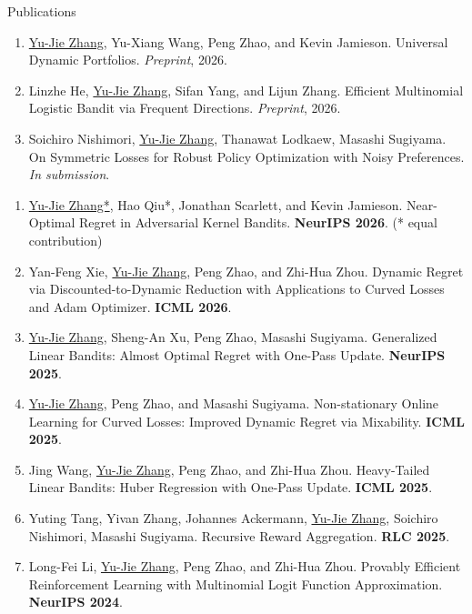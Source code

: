\documentclass{resume} %
\begin{document}
\begin{rSection}{Publications}
\begin{enumerate}[leftmargin=0.2in]
	\item \underline{Yu-Jie Zhang}, Yu-Xiang Wang, Peng Zhao, and Kevin Jamieson. Universal Dynamic Portfolios. \emph{Preprint}, 2026.
	\item Linzhe He, \underline{Yu-Jie Zhang}, Sifan Yang, and Lijun Zhang. Efficient Multinomial Logistic Bandit via Frequent Directions. \emph{Preprint}, 2026.
	\item Soichiro Nishimori, \underline{Yu-Jie Zhang}, Thanawat Lodkaew, Masashi Sugiyama. On Symmetric Losses for Robust Policy Optimization with Noisy Preferences. \emph{In submission}.
\end{enumerate}

\newpage
{}
\begin{enumerate}[leftmargin=0.2in, itemsep=-3pt]
	\item \underline{Yu-Jie Zhang*}, Hao Qiu*, Jonathan Scarlett, and Kevin Jamieson. Near-Optimal Regret in Adversarial Kernel Bandits. \textbf{NeurIPS 2026}. (* equal contribution)

	\item Yan-Feng Xie, \underline{Yu-Jie Zhang}, Peng Zhao, and Zhi-Hua Zhou. Dynamic Regret via Discounted-to-Dynamic Reduction with Applications to Curved Losses and Adam Optimizer. \textbf{ICML 2026}. 

	\item	\underline{Yu-Jie Zhang}, Sheng-An Xu, Peng Zhao, Masashi Sugiyama. Generalized Linear Bandits: Almost Optimal Regret with One-Pass Update. \textbf{NeurIPS 2025}. 

	\item \underline{Yu-Jie Zhang}, Peng Zhao, and Masashi Sugiyama. Non-stationary Online Learning for Curved Losses: Improved Dynamic Regret via Mixability. \textbf{ICML 2025}. 
	
	\item Jing Wang, \underline{Yu-Jie Zhang}, Peng Zhao, and Zhi-Hua Zhou. Heavy-Tailed Linear Bandits: Huber Regression with One-Pass Update. \textbf{ICML 2025}.

	\item Yuting Tang, Yivan Zhang, Johannes Ackermann, \underline{Yu-Jie Zhang}, Soichiro Nishimori, Masashi Sugiyama. Recursive Reward Aggregation. \textbf{RLC 2025}.
	
	\item Long-Fei Li, \underline{Yu-Jie Zhang}, Peng Zhao, and Zhi-Hua Zhou. Provably Efficient Reinforcement Learning with Multinomial Logit Function Approximation. \textbf{NeurIPS 2024}.
	

\end{enumerate}
\end{rSection}
\end{document}
